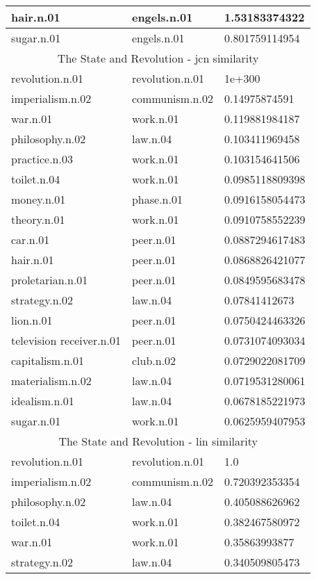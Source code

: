 \begin{center}
\begin{tabular}{ | l | l | l |}
hair.n.01 & engels.n.01 & 1.53183374322\\ \hline
sugar.n.01 & engels.n.01 & 0.801759114954\\ \hline
\multicolumn{3}{|c|}{The State and Revolution - jcn similarity} \\ \hline
revolution.n.01 & revolution.n.01 & 1e+300\\ \hline
imperialism.n.02 & communism.n.02 & 0.14975874591\\ \hline
war.n.01 & work.n.01 & 0.119881984187\\ \hline
philosophy.n.02 & law.n.04 & 0.103411969458\\ \hline
practice.n.03 & work.n.01 & 0.103154641506\\ \hline
toilet.n.04 & work.n.01 & 0.0985118809398\\ \hline
money.n.01 & phase.n.01 & 0.0916158054473\\ \hline
theory.n.01 & work.n.01 & 0.0910758552239\\ \hline
car.n.01 & peer.n.01 & 0.0887294617483\\ \hline
hair.n.01 & peer.n.01 & 0.0868826421077\\ \hline
proletarian.n.01 & peer.n.01 & 0.0849595683478\\ \hline
strategy.n.02 & law.n.04 & 0.07841412673\\ \hline
lion.n.01 & peer.n.01 & 0.0750424463326\\ \hline
television receiver.n.01 & peer.n.01 & 0.0731074093034\\ \hline
capitalism.n.01 & club.n.02 & 0.0729022081709\\ \hline
materialism.n.02 & law.n.04 & 0.0719531280061\\ \hline
idealism.n.01 & law.n.04 & 0.0678185221973\\ \hline
sugar.n.01 & work.n.01 & 0.0625959407953\\ \hline
\multicolumn{3}{|c|}{The State and Revolution - lin similarity} \\ \hline
revolution.n.01 & revolution.n.01 & 1.0\\ \hline
imperialism.n.02 & communism.n.02 & 0.720392353354\\ \hline
philosophy.n.02 & law.n.04 & 0.405088626962\\ \hline
toilet.n.04 & work.n.01 & 0.382467580972\\ \hline
war.n.01 & work.n.01 & 0.35863993877\\ \hline
strategy.n.02 & law.n.04 & 0.340509805473\\ \hline

\end{tabular}
\end{center}
